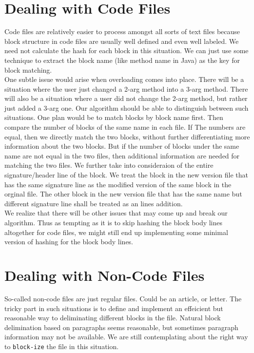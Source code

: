 \documentclass{article}
\begin{document}
\section{Dealing with Code Files}
Code files are relatively easier to process amongst all sorts of text files because block structure in code files are usually well defined and even well labeled. We need not calculate the hash for each block in this situation. We can just use some technique to extract the block name (like method name in Java) as the key for block matching. \\

One subtle issue would arise when overloading comes into place. There will be a situation where the user just changed a 2-arg method into a 3-arg method. There will also be a situation where a user did not change the 2-arg method, but rather just added a 3-arg one. Our algorithm should be able to distinguish between such situations. One plan would be to match blocks by block name first. Then compare the number of blocks of the same name in each file. If The numbers are equal, then we directly match the two blocks, without further differentiating more information about the two blocks. But if the number of blocks under the same name are not equal in the two files, then additional information are needed for matching the two files. We further take into consideraion of the entire signature/header line of the block. We treat the block in the new version file that has the same signature line as the modified version of the same block in the orginal file. The other block in the new version file that has the same name but different signature line shall be treated as an lines addition.\\

We realize that there will be other issues that may come up and break our algorithm. Thus as tempting as it is to skip hashing the block body lines altogether for code files, we might still end up implementing some minimal version of hashing for the block body lines. 

\section{Dealing with Non-Code Files}
So-called non-code files are just regular files. Could be an article, or letter. The tricky part in such situations is to define and implement an effeicient but reasonable way to deliminating different blocks in the file. Natural block delimination based on paragraphs seems reasonable, but sometimes paragraph information may not be available. We are still contemplating about the right way to \texttt{block-ize} the file in this situation. \\
\end{document}
